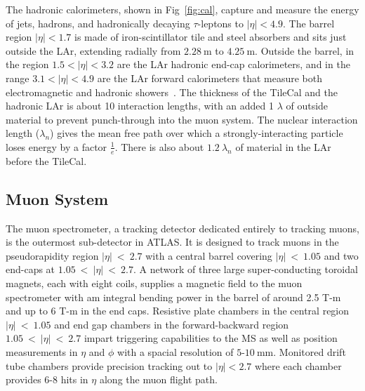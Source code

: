 The hadronic calorimeters, shown in Fig~\ref{fig:cal}, capture and measure the energy of jets, hadrons, and hadronically decaying $\tau$-leptons to $|\eta|<4.9$.  The barrel region $|\eta| < 1.7$ is made of iron-scintillator tile and steel absorbers and sits just outside the LAr, extending radially from $2.28~\mathrm{m}$ to $4.25~\mathrm{m}$.  Outside the barrel, in the region $1.5<|\eta|<3.2$ are the LAr hadronic end-cap calorimeters, and in the range $3.1<|\eta|<4.9$ are the LAr forward calorimeters that measure both electromagnetic and hadronic showers~\cite{henriqu:tile}.  The thickness of the TileCal and the hadronic LAr is about 10 interaction lengths, with an added 1 $\lambda$ of outside material to prevent punch-through into the muon system.  The nuclear interaction length ($\lambda_n$) gives the mean free path over which a strongly-interacting particle loses energy by a factor $\frac{1}{e}$.  There is also about $1.2~\lambda_n$ of material in the LAr before the TileCal.   
\subsection{Muon System}
The muon spectrometer, a tracking detector dedicated entirely to tracking muons, is the outermost sub-detector in ATLAS.  It is designed to track muons in the pseudorapidity region $|\eta|~<~2.7$ with a central barrel covering $|\eta|~<~1.05$ and two end-caps at $1.05~<~|\eta|~<~2.7$.  A network of three large super-conducting toroidal magnets, each with eight coils, supplies a magnetic field to the muon spectrometer with am integral bending power in the barrel of around 2.5 T-m and up to 6 T-m in the end caps.  Resistive plate chambers in the central region $|\eta|~<~1.05$ and end gap chambers in the forward-backward region $1.05~<~|\eta|~<~2.7$ impart triggering capabilities to the MS as well as position measurements in $\eta$ and $\phi$ with a spacial resolution of $5$-$10~\mathrm{mm}$. Monitored drift tube chambers provide precision tracking out to $|\eta| < 2.7$ where each chamber provides $6$-$8$ hits in $\eta$ along the muon flight path.  %

